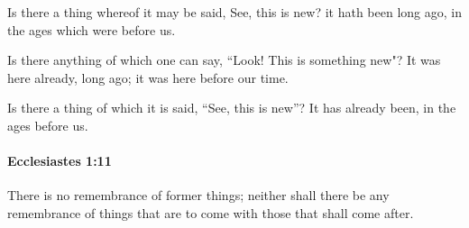 			\begin{versebox}
					\item[BHS] 
					\item[LXX] 
					\item[ASV] Is there a thing whereof it may be said, See, this is new? it hath been long ago, in the ages which were before us.
					\item[NIV] Is there anything of which one can say, “Look! This is something new"? It was here already, long ago; it was here before our time.
					\item[NRSV] Is there a thing of which it is said, “See, this is new”? It has already been, in the ages before us.
			\end{versebox}

		\paragraph{Ecclesiastes 1:11} %
			\label{ECCLESIASTES-1-11}

			There is no remembrance of former things; neither shall there be any remembrance of things that are to come with those that shall come after.

